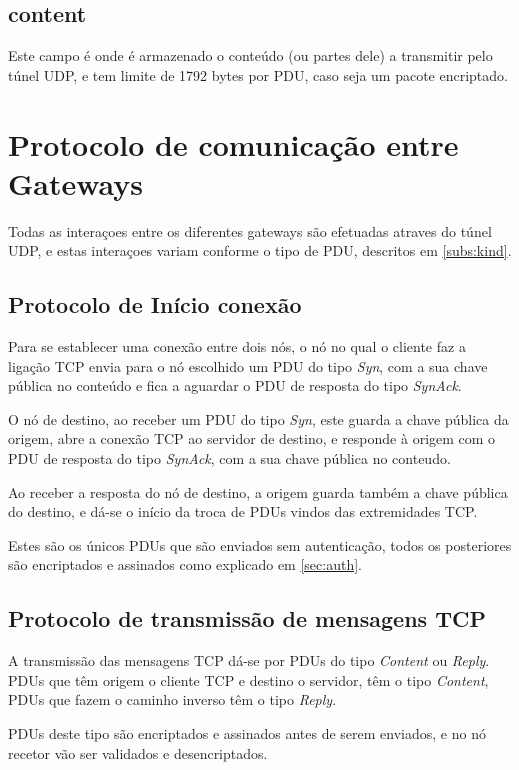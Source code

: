 \documentclass[a4paper]{report}
\begin{document}
\subsection{content}

Este campo é onde é armazenado o conteúdo (ou partes dele) a transmitir pelo
túnel UDP, e tem limite de 1792 bytes por PDU, caso seja um pacote encriptado.

\section{Protocolo de comunicação entre Gateways}

Todas as interaçoes entre os diferentes gateways são efetuadas atraves do túnel
UDP, e estas interaçoes variam conforme o tipo de PDU, descritos em 
\ref{subs:kind}.

\subsection{Protocolo de Início conexão}

Para se establecer uma conexão entre dois nós, o nó no qual o cliente
faz a ligação TCP envia para o nó escolhido um PDU do tipo \textit{Syn},
com a sua chave pública no conteúdo e fica a aguardar o PDU de resposta 
do tipo \textit{SynAck}.

O nó de destino, ao receber um PDU do tipo \textit{Syn}, este guarda
a chave pública da origem, abre a conexão TCP ao servidor de destino, e
responde à origem com o PDU de resposta do tipo \textit{SynAck}, com a sua
chave pública no conteudo.

Ao receber a resposta do nó de destino, a origem guarda também a chave
pública do destino, e dá-se o início da troca de PDUs vindos das 
extremidades TCP.

Estes são os únicos PDUs que são enviados sem autenticação, todos os
posteriores são encriptados e assinados como explicado em \ref{sec:auth}.

\subsection{Protocolo de transmissão de mensagens TCP}

A transmissão das mensagens TCP dá-se por PDUs do tipo \textit{Content} ou
\textit{Reply}. PDUs que têm origem o cliente TCP e destino o servidor,
têm o tipo \textit{Content}, PDUs que fazem o caminho inverso têm o tipo
\textit{Reply}.

PDUs deste tipo são encriptados e assinados antes de serem enviados, e no
nó recetor vão ser validados e desencriptados.
\end{document}
